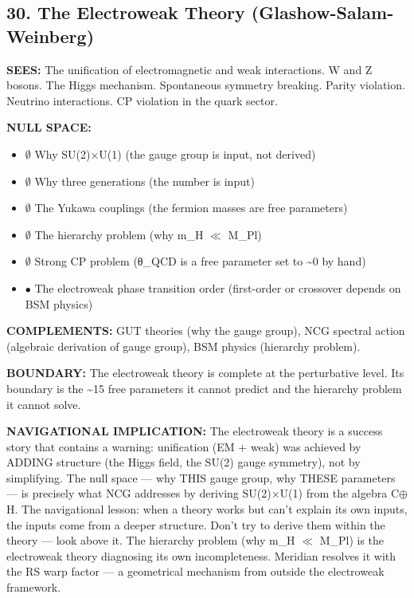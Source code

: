 \bigskip\noindent\makebox[\textwidth]{\color{rulegray}\rule{5cm}{0.3pt}}\bigskip


\subsection*{30. The Electroweak Theory (Glashow-Salam-Weinberg)}


\textbf{SEES:} The unification of electromagnetic and weak interactions. W and Z bosons. The Higgs mechanism. Spontaneous symmetry breaking. Parity violation. Neutrino interactions. CP violation in the quark sector.


\textbf{NULL SPACE:}

\begin{itemize}[nosep,leftmargin=*]
  \item $\emptyset$ Why SU(2)×U(1) (the gauge group is input, not derived)
  \item $\emptyset$ Why three generations (the number is input)
  \item $\emptyset$ The Yukawa couplings (the fermion masses are free parameters)
  \item $\emptyset$ The hierarchy problem (why m\_H $\ll$ M\_Pl)
  \item $\emptyset$ Strong CP problem (θ\_QCD is a free parameter set to \textasciitilde{}0 by hand)
  \item $\bullet$ The electroweak phase transition order (first-order or crossover depends on BSM physics)
\end{itemize}


\textbf{COMPLEMENTS:} GUT theories (why the gauge group), NCG spectral action (algebraic derivation of gauge group), BSM physics (hierarchy problem).


\textbf{BOUNDARY:} The electroweak theory is complete at the perturbative level. Its boundary is the \textasciitilde{}15 free parameters it cannot predict and the hierarchy problem it cannot solve.


\textbf{NAVIGATIONAL IMPLICATION:} The electroweak theory is a success story that contains a warning: unification (EM + weak) was achieved by ADDING structure (the Higgs field, the SU(2) gauge symmetry), not by simplifying. The null space — why THIS gauge group, why THESE parameters — is precisely what NCG addresses by deriving SU(2)×U(1) from the algebra C$\oplus$H. The navigational lesson: when a theory works but can't explain its own inputs, the inputs come from a deeper structure. Don't try to derive them within the theory — look above it. The hierarchy problem (why m\_H $\ll$ M\_Pl) is the electroweak theory diagnosing its own incompleteness. Meridian resolves it with the RS warp factor — a geometrical mechanism from outside the electroweak framework.



